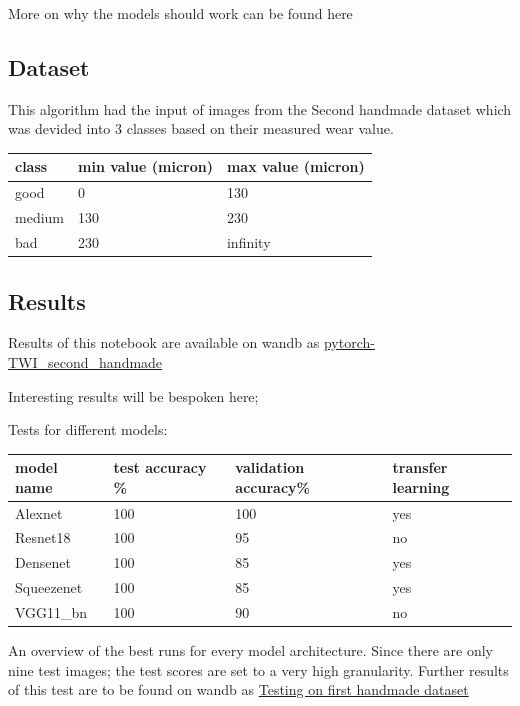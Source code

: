 More on why the models should work can be found here



\subsection{Dataset}



This algorithm had the input of images from the Second handmade dataset which was devided into 3 classes based on their measured wear value. 

\begin{tabular}{ |l|l|l| }
\hline
 class & min value (micron) & max value (micron) \tabularnewline
\hline
\hline
 good & 0 & 130 \tabularnewline
\hline
 medium & 130 & 230 \tabularnewline
\hline
 bad & 230 & infinity \tabularnewline
\hline
\end{tabular}










\subsection{Results}

Results of this notebook are available on wandb as \href{https://wandb.ai/dplars/pytorch-TWI_second_handmade?workspace=user-dplars}{pytorch-TWI\_second\_handmade}



Interesting results will be bespoken here;

Tests for different models: 

\begin{tabular}{ |l|l|l|l| }
\hline
 model name & test accuracy \% & validation accuracy\% & transfer learning \tabularnewline
\hline
\hline
 Alexnet & 100 & 100 & yes \tabularnewline
\hline
 Resnet18 & 100 & 95 & no \tabularnewline
\hline
 Densenet & 100 & 85 & yes \tabularnewline
\hline
 Squeezenet & 100 & 85 & yes \tabularnewline
\hline
 VGG11\_bn & 100 & 90 & no \tabularnewline
\hline
\end{tabular}
										

An overview of the best runs for every model architecture. Since there are only nine test images; the test scores are set to a very high granularity. Further results of this test are to be found on wandb as \href{https://wandb.ai/dplars/pytorch-TWI_second_handmade/reports/Testing-on-first-handmade-dataset--VmlldzozNTE5NzM}{Testing on first handmade dataset}





